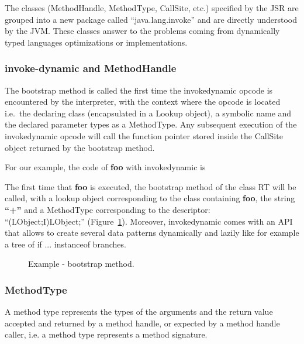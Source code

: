 \documentclass{sig-alternate}
\def \Jsr{JSR\xspace}
\def \JVM{JVM\xspace}
\begin{document}
      The classes (MethodHandle, MethodType, CallSite, etc.) specified by the \Jsr are grouped into a new
      package called ``java.lang.invoke'' and are directly understood by the \JVM.
      These classes answer to the problems coming from dynamically typed languages optimizations or implementations.

    \subsubsection{invoke-dynamic and MethodHandle}

      The bootstrap method is called the first time the invokedynamic opcode is encountered by the interpreter,
      with the context where the opcode is located i.e.~the declaring class (encapsulated in a Lookup object),
      a symbolic name and the declared parameter types as a MethodType.
      Any subsequent execution of the invokedynamic opcode will call the function pointer
      stored inside the CallSite object returned by the bootstrap method.
      
      For our example, the code of {\bf foo} with invokedynamic is

      

      The first time that {\bf foo} is executed, the bootstrap method of the class RT will be called, with a lookup object corresponding to the class containing {\bf foo},
      the string {\bf ``+''} and a MethodType corresponding to the descriptor:\\``(LObject;I)LObject;'' (Figure~\ref{fooBSM}).
      Moreover, invokedynamic comes with an API that allows to create several data patterns
      dynamically and lazily like for example a tree of if ... instanceof branches.

      \begin{figure}[!ht]
        \centering \vspace{-1.5em}
        \caption{Example - bootstrap method.}
        \label{fooBSM}
      \end{figure}

    \subsubsection{MethodType}

      A method type represents the types of the arguments and the return value accepted and returned by a method handle,
      or expected by a method handle caller, i.e. a method type represents a method signature.
\end{document}
